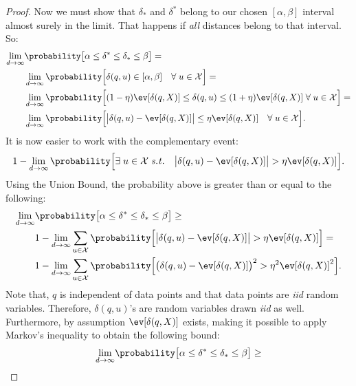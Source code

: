 \begin{proof}
    Now we must show that $\delta_\ast$ and $\delta^\ast$ belong to our
    chosen $[\alpha, \beta]$ interval almost surely in the limit. That happens if \emph{all} distances belong to 
    that interval. So:
    \begin{align*}
        \lim_{d \rightarrow \infty} &\probability\big[ \alpha \leq \delta^\ast \leq \delta_\ast \leq \beta \big] = \\
        &\lim_{d \rightarrow \infty} \probability\Big[ \delta(q, u) \in [\alpha, \beta] \quad \forall \; u \in \mathcal{X} \Big] = \\
        &\lim_{d \rightarrow \infty} \probability\Big[ (1 - \eta) \ev[\delta(q, X)] \leq \delta(q, u) \leq (1 + \eta) \ev[\delta(q, X)] \; \forall \; u \in \mathcal{X} \Big] = \\
        &\lim_{d \rightarrow \infty} \probability\Big[ \big\lvert \delta(q, u) - \ev[\delta(q, X)] \big\rvert \leq \eta \ev[\delta(q, X)] \quad \forall \; u \in \mathcal{X} \Big].
    \end{align*}
    It is now easier to work with the complementary event:
    \begin{equation*}
        1 - \lim_{d \rightarrow \infty} \probability\Big[ \exists \; u \in \mathcal{X} \; \mathit{s.t.} \quad \big\lvert \delta(q, u) - \ev[\delta(q, X)] \big\rvert > \eta \ev[\delta(q, X)] \Big].
    \end{equation*}
    Using the Union Bound, the probability above is greater than or equal to the following:
    \begin{align*}
    \lim_{d \rightarrow \infty} &\probability\big[ \alpha \leq \delta^\ast \leq \delta_\ast \leq \beta \big] \geq \\
        &1 - \lim_{d \rightarrow \infty} \sum_{u \in \mathcal{X}} \probability\Big[\big\lvert \delta(q, u) - \ev[\delta(q, X)] \big\lvert > \eta \ev[\delta(q, X)] \Big] = \\
        &1 - \lim_{d \rightarrow \infty} \sum_{u \in \mathcal{X}} \probability\Big[\big( \delta(q, u) - \ev[\delta(q, X)] \big)^2 > \eta^2 \ev[\delta(q, X)]^2 \Big].
    \end{align*}
    Note that, $q$ is independent of data points and that data points are \emph{iid} random variables.
    Therefore, $\delta(q, u)$'s are random variables drawn \emph{iid} as well.
    Furthermore, by assumption $\ev[\delta(q, X)]$ exists, making it possible to apply Markov's inequality to obtain the following bound:
    \begin{align*}
    \lim_{d \rightarrow \infty} &\probability\big[ \alpha \leq \delta^\ast \leq \delta_\ast \leq \beta \big] \geq \\

\end{align*}
\end{proof}
